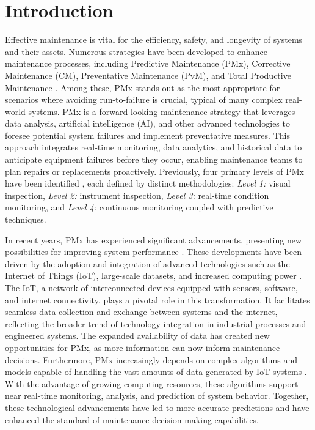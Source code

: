\documentclass[runningheads]{llncs}
\begin{document}
\section{Introduction}


Effective maintenance is vital for the efficiency, safety, and longevity of systems and their assets. Numerous strategies have been developed to enhance maintenance processes, including Predictive Maintenance (PMx), Corrective Maintenance (CM), Preventative Maintenance (PvM), and Total Productive Maintenance \cite{mobley2002introduction}. Among these, PMx stands out as the most appropriate for scenarios where avoiding run-to-failure is crucial, typical of many complex real-world systems. PMx is a forward-looking maintenance strategy that leverages data analysis, artificial intelligence (AI), and other advanced technologies to foresee potential system failures and implement preventative measures. This approach integrates real-time monitoring, data analytics, and historical data to anticipate equipment failures before they occur, enabling maintenance teams to plan repairs or replacements proactively. Previously, four primary levels of PMx have been identified \cite{haarman2017predictive}, each defined by distinct methodologies: \textit{Level 1:} visual inspection, \textit{Level 2:} instrument inspection, \textit{Level 3:} real-time condition monitoring, and \textit{Level 4:} continuous monitoring coupled with predictive techniques.

In recent years, PMx has experienced significant advancements, presenting new possibilities for improving system performance \cite{SAKIB2018267}. These developments have been driven by the adoption and integration of advanced technologies such as the Internet of Things (IoT), large-scale datasets, and increased computing power \cite{ran2019survey}. The IoT, a network of interconnected devices equipped with sensors, software, and internet connectivity, plays a pivotal role in this transformation. It facilitates seamless data collection and exchange between systems and the internet, reflecting the broader trend of technology integration in industrial processes and engineered systems. The expanded availability of data has created new opportunities for PMx, as more information can now inform maintenance decisions. Furthermore, PMx increasingly depends on complex algorithms and models capable of handling the vast amounts of data generated by IoT systems \cite{SAKIB2018267,serradilla2022deep}. With the advantage of growing computing resources, these algorithms support near real-time monitoring, analysis, and prediction of system behavior. Together, these technological advancements have led to more accurate predictions and have enhanced the standard of maintenance decision-making capabilities.
\end{document}
